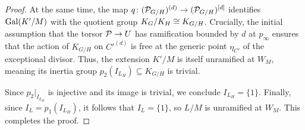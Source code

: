 \documentclass[11pt]{article}
\begin{document}
\begin{proof}
At the same time, the map $q \colon (\mathcal{P}_{G/H})^{(d)} \to (\mathcal{P}_{G/H})^{[d]}$ identifies $\operatorname{Gal}(K'/M)$ with the quotient group $K_{G} / K_H \cong K_{G/H}$. Crucially, the initial assumption that the torsor $\mathcal{P} \to U$ has ramification bounded by $d$ at $p_\infty$ ensures that the action of $K_{G/H}$ on $C'^{(d)}$ is free at the generic point $\eta_{C'}$ of the exceptional divisor. Thus, the extension $K'/M$ is itself unramified at $W_M$, meaning its inertia group $p_2(I_{L_H}) \subseteq K_{G/H}$ is trivial.

Since $p_2|_{I_{L_H}}$ is injective and its image is trivial, we conclude $I_{L_H} = \{1\}$. Finally, since $I_L = p_1(I_{L_H})$, it follows that $I_L = \{1\}$, so $L/M$ is unramified at $W_M$. This completes the proof.
\end{proof}

\printbibliography
\end{document}

